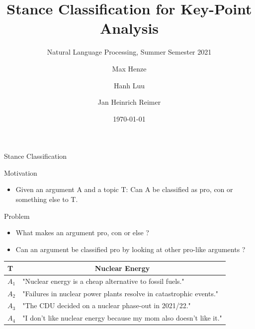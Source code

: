 \documentclass[english,handout]{mlutalk}
\title{Stance Classification for Key-Point Analysis}
\subtitle{Natural Language Processing, Summer Semester 2021}
\author{Max Henze \and Hanh Luu \and Jan Heinrich Reimer}
\institute{Martin Luther University Halle-Wittenberg}
\date{\today}
\begin{document}
\titleframe

\begin{frame}{Stance Classification} 
  \begin{block}{Motivation}
    \begin{itemize}
      \item Given an argument A and a topic T: Can A be classified as pro, con or something else to T.
    \end{itemize}
  \end{block}
  \begin{block}{Problem}
    \begin{itemize}
      \item What makes an argument pro, con or else ? 
      \item Can an argument be classified pro by looking at other pro-like arguments ?
    \end{itemize}
  \end{block}
  \begin{example}
    \begin{tabular}{l|l}
      T & \multicolumn{1}{c}{Nuclear Energy}\\
      \hline
      $A_1$ & "Nuclear energy is a cheap alternative to fossil fuels."\\
      $A_2$ & "Failures in nuclear power plants resolve in catastrophic events."\\
      $A_3$ & "The CDU decided on a nuclear phase-out in 2021/22."\\
      $A_4$ & "I don't like nuclear energy because my mom also doesn't like it."
    \end{tabular}
  \end{example}
\end{frame}
\end{document}
